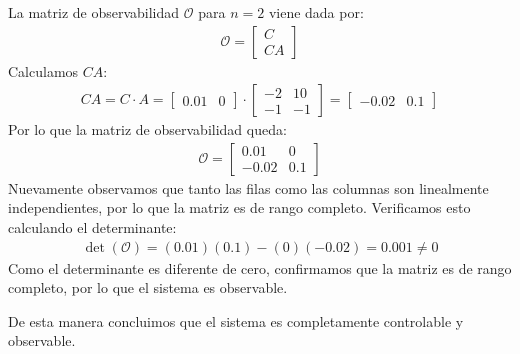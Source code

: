 \documentclass[
  11pt,
  letterpaper,
   addpoints,
  answers
  ]{exam}
\begin{document}
\begin{solution}
La matriz de observabilidad $\mathcal{O}$ para $n=2$ viene dada por:
\begin{align}
\mathcal{O} = \begin{bmatrix} C \\ CA \end{bmatrix}
\end{align}
Calculamos $CA$:
\begin{align}
CA = C \cdot A = \begin{bmatrix} 0.01 & 0 \end{bmatrix} \cdot \begin{bmatrix} -2 & 10 \\ -1 & -1 \end{bmatrix} = \begin{bmatrix} -0.02 & 0.1 \end{bmatrix}
\end{align}
Por lo que la matriz de observabilidad queda:
\begin{align}
\mathcal{O} = \begin{bmatrix} 0.01 & 0 \\ -0.02 & 0.1 \end{bmatrix}
\end{align}
Nuevamente observamos que tanto las filas como las columnas son linealmente independientes, por lo que la matriz es de rango completo. Verificamos esto calculando el determinante:
\begin{align}
\det(\mathcal{O}) = (0.01)(0.1) - (0)(-0.02) = 0.001 \neq 0
\end{align}
Como el determinante es diferente de cero, confirmamos que la matriz es de rango completo, por lo que el sistema es observable. 

De esta manera concluimos que el sistema es completamente controlable y observable.

\end{solution}
\end{document}
